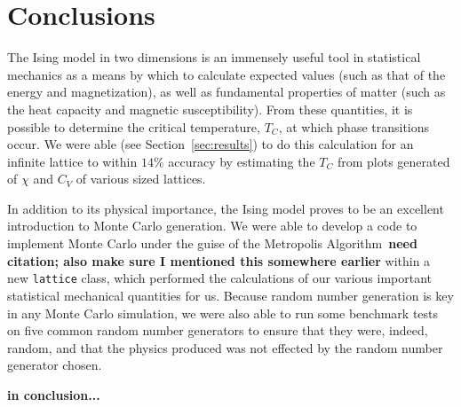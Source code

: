 \documentclass[12pt]{article}
\numberwithin{equation}{section}
\begin{document}
\section{Conclusions}
\label{sec:conc}

The Ising model in two dimensions is an immensely useful tool in statistical mechanics as a means by which to calculate expected values (such as that of the energy and magnetization), as well as fundamental properties of matter (such as the heat capacity and magnetic susceptibility).  From these quantities, it is possible to determine the critical temperature, $T_{C}$, at which phase transitions occur.  We were able (see Section~\ref{sec:results}) to do this calculation for an infinite lattice to within $14\%$ accuracy by estimating the $T_{C}$ from plots generated of $\chi$ and $C_{V}$ of various sized lattices.
\par In addition to its physical importance, the Ising model proves to be an excellent introduction to Monte Carlo generation.  We were able to develop a code to implement Monte Carlo under the guise of the Metropolis Algorithm~\textbf{need citation; also make sure I mentioned this somewhere earlier} within a new \texttt{lattice} class, which performed the calculations of our various important statistical mechanical quantities for us.  Because random number generation is key in any Monte Carlo simulation, we were also able to run some benchmark tests on five common random number generators to ensure that they were, indeed, random, and that the physics produced was not effected by the random number generator chosen.
\par \textbf{in conclusion...}
\end{document}
